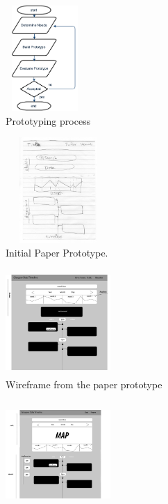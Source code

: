 \documentclass{l4proj}
\begin{document}
\begin{figure}[H]
	\begin{subfigure}{.3\textwidth}
		\centering
		\includegraphics[height=4cm,width=3cm]{images/uiPrototyping}
		\caption{Prototyping process}
		\label{uiPrototyping}
	\end{subfigure}
	\begin{subfigure}{.3\textwidth}
		\centering
		\includegraphics[height=4cm,width=4cm]{images/initialPaperPrototype}
		\caption{Initial Paper Prototype.}
		\label{initialPaperPrototype}
	\end{subfigure}
	\begin{subfigure}{.3\textwidth}
		\centering
		\includegraphics[height=4cm,width=4cm]{images/initialWireframe}
		\caption{Wireframe from the paper prototype}
		\label{initialWireframe}
	\end{subfigure}
	\begin{subfigure}{.3\textwidth}
		\centering
		\includegraphics[height=4cm,width=4cm]{images/FinalPrototypeEvent}

\end{subfigure}
\end{figure}
\end{document}
